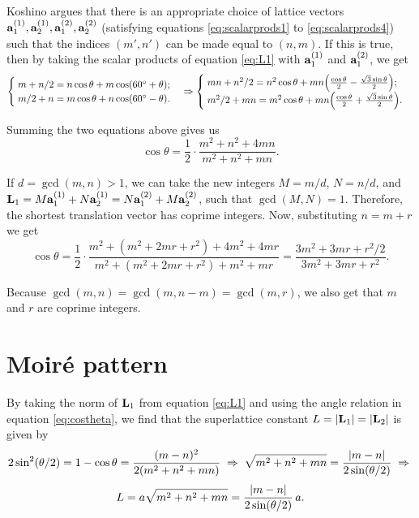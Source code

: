 \documentclass[a4paper,10pt]{article}
\begin{document}
Koshino \cite{koshino2012} argues that there is an appropriate choice of lattice vectors $\vb{a}_1^{(1)}, \vb{a}_2^{(1)}, \vb{a}_1^{(2)}, \vb{a}_2^{(2)}$ (satisfying equations \ref{eq:scalarprods1} to \ref{eq:scalarprods4}) such that the indices $(m',n')$ can be made equal to $(n,m)$. If this is true, then by taking the scalar products of equation \ref{eq:L1} with $\vb{a}_1^{(1)}$ and $\vb{a}_1^{(2)}$, we get
$$
\begin{cases}
\; m + n/2 = n \cos\theta + m \cos(60^\circ + \theta); \\
\; m/2 + n = m \cos\theta + n \cos(60^\circ - \theta).
\end{cases}
\Rightarrow
\begin{cases}
\; mn + n^2/2 = n^2 \cos\theta + mn \qty(\frac{\cos\theta}{2}
- \frac{\sqrt{3} \sin\theta}{2}); \\
\; m^2/2 + mn = m^2 \cos\theta + mn \qty(\frac{\cos\theta}{2}
+ \frac{\sqrt{3} \sin\theta}{2}).
\end{cases}
$$

Summing the two equations above gives us
\begin{equation} \label{eq:costheta}
\boxed{\cos\theta = \frac{1}{2} \cdot \frac{m^2 + n^2 + 4mn}{m^2 + n^2 + mn}.}
\end{equation}

If $d = \gcd(m, n) > 1$, we can take the new integers $M = m/d$, $N = n/d$, and $\vb{L}_1 = M\vb{a}_1^{(1)} + N\vb{a}_2^{(1)} = N\vb{a}_1^{(2)} + M\vb{a}_2^{(2)}$, such that $\gcd(M, N) = 1$. Therefore, the shortest translation vector has coprime integers. Now, substituting $n = m + r$ we get
\begin{equation} \label{eq:costheta-r}
\boxed{\cos\theta = \frac{1}{2} \cdot \frac{m^2 + (m^2 + 2mr + r^2) + 4m^2 + 4mr}{m^2 + (m^2 + 2mr + r^2) + m^2 + mr} =
\frac{3 m^2 + 3mr + r^2/2}{3m^2 + 3mr + r^2}. }
\end{equation}

Because $\gcd(m, n) = \gcd(m, n-m) = \gcd(m, r)$, we also get that $m$ and $r$ are coprime integers.


\pagebreak

\section{Moiré pattern}

By taking the norm of $\vb{L}_1$ from equation \ref{eq:L1} and using the angle relation in equation \ref{eq:costheta}, we find that the superlattice constant $L = \abs{\vb{L}_1} = \abs{\vb{L}_2}$ is given by
$$
2\sin[2](\theta/2) = 1 - \cos\theta = \frac{(m-n)^2}{2(m^2+n^2+mn)} \; \Rightarrow \;
\sqrt{m^2+n^2+mn} = \frac{\abs{m-n}}{2\sin(\theta/2)} \; \Rightarrow \;
$$
\begin{equation} \label{eq:}
L = a\sqrt{m^2 + n^2 + mn} = \frac{\abs{m-n}}{2 \sin(\theta/2)} \, a.
\end{equation}
\end{document}

